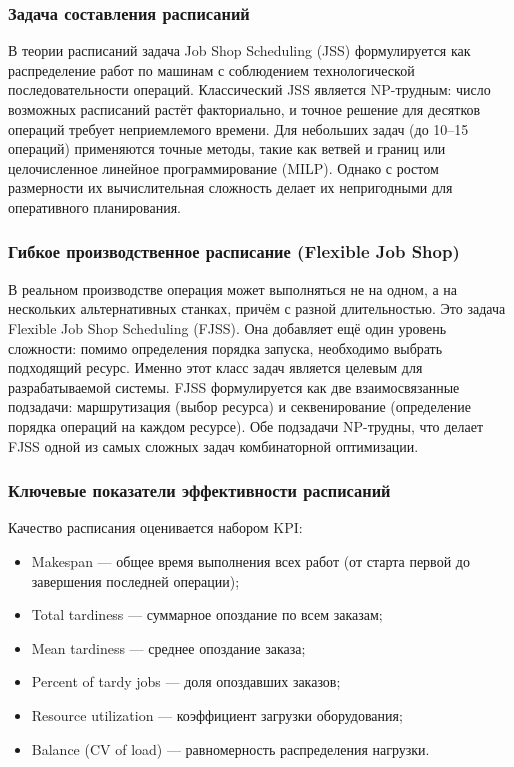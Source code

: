 \subsubsection{Задача составления расписаний}

В теории расписаний задача Job Shop Scheduling (JSS) формулируется как распределение  работ по  машинам с соблюдением технологической последовательности операций. Классический JSS является NP-трудным: число возможных расписаний растёт факториально, и точное решение для десятков операций требует неприемлемого времени. Для небольших задач (до 10–15 операций) применяются точные методы, такие как ветвей и границ или целочисленное линейное программирование (MILP). Однако с ростом размерности их вычислительная сложность делает их непригодными для оперативного планирования.

\subsubsection{Гибкое производственное расписание (Flexible Job Shop)}

В реальном производстве операция может выполняться не на одном, а на нескольких альтернативных станках, причём с разной длительностью. Это задача Flexible Job Shop Scheduling (FJSS). Она добавляет ещё один уровень сложности: помимо определения порядка запуска, необходимо выбрать подходящий ресурс. Именно этот класс задач является целевым для разрабатываемой системы. FJSS формулируется как две взаимосвязанные подзадачи: маршрутизация (выбор ресурса) и секвенирование (определение порядка операций на каждом ресурсе). Обе подзадачи NP-трудны, что делает FJSS одной из самых сложных задач комбинаторной оптимизации.

\subsubsection{Ключевые показатели эффективности расписаний}

Качество расписания оценивается набором KPI:

\begin{itemize}
    \item Makespan — общее время выполнения всех работ (от старта первой до завершения последней операции);
    \item Total tardiness — суммарное опоздание по всем заказам;
    \item Mean tardiness — среднее опоздание заказа;
    \item Percent of tardy jobs — доля опоздавших заказов;
    \item Resource utilization — коэффициент загрузки оборудования;
    \item Balance (CV of load) — равномерность распределения нагрузки.
\end{itemize}

